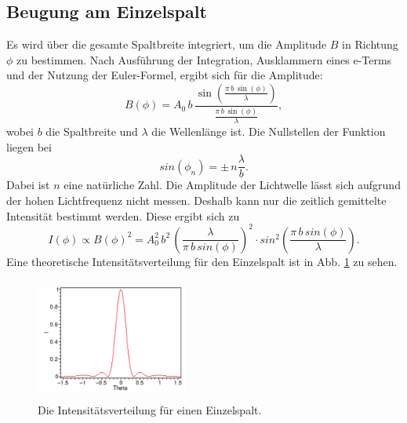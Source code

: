 \subsection{Beugung am Einzelspalt}
Es wird über die gesamte Spaltbreite integriert, um die 
Amplitude $B$ in Richtung $\phi$ zu bestimmen. Nach Ausführung 
der Integration, Ausklammern eines e-Terms und der Nutzung 
der Euler-Formel, ergibt sich für die Amplitude:
\begin{equation*}
    B(\phi) = A_0 \, b \, \frac{\sin(\frac{\pi \, b \, \sin(\phi)}{\lambda})}{\frac{\pi \, b \, \sin(\phi)}{\lambda}},
\end{equation*}
wobei $b$ die Spaltbreite und $\lambda$ 
die Wellenlänge ist. 
Die Nullstellen der Funktion liegen bei
\begin{equation*} 
    sin(\phi_n)= \pm \, n \frac{\lambda}{b}.
\end{equation*}
Dabei ist $n$ eine natürliche Zahl.
Die Amplitude der Lichtwelle lässt sich aufgrund der hohen 
Lichtfrequenz nicht messen. Deshalb kann nur die zeitlich 
gemittelte Intensität bestimmt werden. 
\newline
Diese ergibt sich zu 
\begin{equation}
    I(\phi) \propto B(\phi)^2 = A^{2}_0 \, b^2 \, \left(\frac{\lambda}{\pi \, b \, sin(\phi)} \right)^2 \cdot sin^2 \left(\frac{\pi \, b \, sin(\phi)}{\lambda}\right).
    \label{eqn:intensität}
\end{equation}
Eine theoretische Intensitätsverteilung für den Einzelspalt
ist in Abb. \ref{fig:einzel} zu sehen.
\begin{figure}
    \centering
    \includegraphics[width=5cm, height=4cm]{build/Einzelspalt.png}
    \caption{Die Intensitätsverteilung für einen Einzelspalt. \cite{einzel}}
    \label{fig:einzel}
\end{figure}

